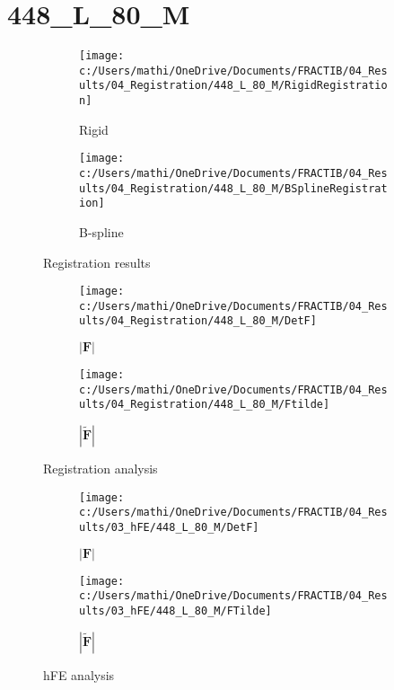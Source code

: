 \documentclass{article}%
\begin{document}
%
\newpage%
\section*{448\_L\_80\_M}%
\label{sec:448L80M}%


\begin{figure}[h!]%
\begin{subfigure}[b]{0.5\linewidth}%
\texttt{[image: c:/Users/mathi/OneDrive/Documents/FRACTIB/04\_Results/04\_Registration/448\_L\_80\_M/RigidRegistration]}%
\caption{Rigid}%
\end{subfigure}%
\begin{subfigure}[b]{0.5\linewidth}%
\texttt{[image: c:/Users/mathi/OneDrive/Documents/FRACTIB/04\_Results/04\_Registration/448\_L\_80\_M/BSplineRegistration]}%
\caption{B{-}spline}%
\end{subfigure}%
\caption{Registration results}%
\end{figure}

%


\begin{figure}[h!]%
\begin{subfigure}[b]{0.5\linewidth}%
\texttt{[image: c:/Users/mathi/OneDrive/Documents/FRACTIB/04\_Results/04\_Registration/448\_L\_80\_M/DetF]}%
\caption{$|\mathbf{F}|$}%
\end{subfigure}%
\begin{subfigure}[b]{0.5\linewidth}%
\texttt{[image: c:/Users/mathi/OneDrive/Documents/FRACTIB/04\_Results/04\_Registration/448\_L\_80\_M/Ftilde]}%
\caption{$|\widetilde{\mathbf{F}}|$}%
\end{subfigure}%
\caption{Registration analysis}%
\end{figure}

%


\begin{figure}[h!]%
\begin{subfigure}[b]{0.5\linewidth}%
\texttt{[image: c:/Users/mathi/OneDrive/Documents/FRACTIB/04\_Results/03\_hFE/448\_L\_80\_M/DetF]}%
\caption{$|\mathbf{F}|$}%
\end{subfigure}%
\begin{subfigure}[b]{0.5\linewidth}%
\texttt{[image: c:/Users/mathi/OneDrive/Documents/FRACTIB/04\_Results/03\_hFE/448\_L\_80\_M/FTilde]}%
\caption{$|\widetilde{\mathbf{F}}|$}%
\end{subfigure}%
\caption{hFE analysis}%
\end{figure}
\end{document}
